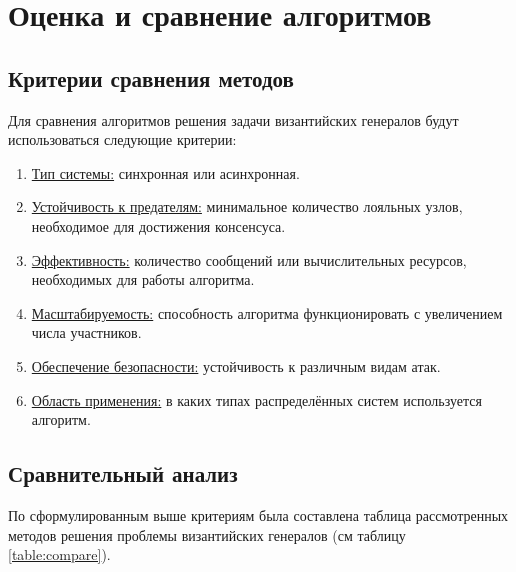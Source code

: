 \section{Оценка и сравнение алгоритмов}

\subsection{Критерии сравнения методов}

\hspace{1.25cm}
Для сравнения алгоритмов решения задачи византийских генералов будут использоваться следующие критерии:

\begin{enumerate}
    \item \underline{Тип системы:} синхронная или асинхронная.
    \item \underline{Устойчивость к предателям:} минимальное количество лояльных узлов, необходимое для достижения консенсуса.
    \item \underline{Эффективность:} количество сообщений или вычислительных ресурсов, необходимых для работы алгоритма.
    \item \underline{Масштабируемость:} способность алгоритма функционировать с увеличением числа участников.
    \item \underline{Обеспечение безопасности:} устойчивость к различным видам атак.
    \item \underline{Область применения:} в каких типах распределённых систем используется алгоритм.
\end{enumerate}


\subsection{Сравнительный анализ}

\hspace{1.25cm}
По сформулированным выше критериям была составлена таблица рассмотренных методов решения проблемы византийских генералов (см таблицу \ref{table:compare}).

